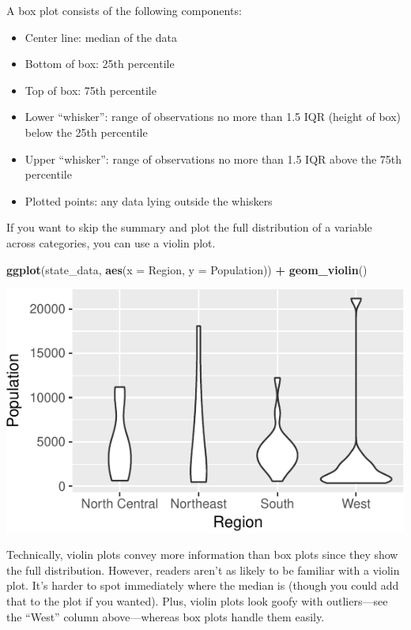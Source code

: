 \documentclass[
  12pt,
  oneside,openany]{book}
\newenvironment{Shaded}{\begin{snugshade}}{\end{snugshade}}
\newcommand{\DataTypeTok}[1]{\textcolor[rgb]{0.13,0.29,0.53}{#1}}
\newcommand{\KeywordTok}[1]{\textcolor[rgb]{0.13,0.29,0.53}{\textbf{#1}}}
\newcommand{\NormalTok}[1]{#1}
\newcommand{\OperatorTok}[1]{\textcolor[rgb]{0.81,0.36,0.00}{\textbf{#1}}}
\newcommand{\StringTok}[1]{\textcolor[rgb]{0.31,0.60,0.02}{#1}}
\providecommand{\tightlist}{%
  \setlength{\itemsep}{0pt}\setlength{\parskip}{0pt}}
\begin{document}
A box plot consists of the following components:

\begin{itemize}
\tightlist
\item
  Center line: median of the data
\item
  Bottom of box: 25th percentile
\item
  Top of box: 75th percentile
\item
  Lower ``whisker'': range of observations no more than 1.5 IQR (height of box) below the 25th percentile
\item
  Upper ``whisker'': range of observations no more than 1.5 IQR above the 75th percentile
\item
  Plotted points: any data lying outside the whiskers
\end{itemize}

If you want to skip the summary and plot the full distribution of a variable across categories, you can use a violin plot.

\begin{Shaded}
\begin{Highlighting}[]
\KeywordTok{ggplot}\NormalTok{(state\_data, }\KeywordTok{aes}\NormalTok{(}\DataTypeTok{x =}\NormalTok{ Region, }\DataTypeTok{y =}\NormalTok{ Population)) }\OperatorTok{+}
\StringTok{  }\KeywordTok{geom\_violin}\NormalTok{()}
\end{Highlighting}
\end{Shaded}

\includegraphics{pdaps_files/figure-latex/violin-1.pdf}

Technically, violin plots convey more information than box plots since they show the full distribution. However, readers aren't as likely to be familiar with a violin plot. It's harder to spot immediately where the median is (though you could add that to the plot if you wanted). Plus, violin plots look goofy with outliers---see the ``West'' column above---whereas box plots handle them easily.
\end{document}
